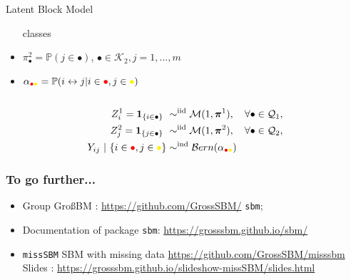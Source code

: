 \documentclass{beamer}\usepackage[]{graphicx}\usepackage[]{color}
\begin{document}
\begin{frame}
\begin{center}
\begin{overlayarea}{\textwidth}{.5\textheight}
\begin{columns}
\begin{column}{.5\paperwidth}
\begin{small}
\begin{block}{Latent Block Model}
\begin{itemize}
                classes
               \item  $\pi^2_\bullet  =  \mathbb{P}(j  \in  \bullet)$,
                $\bullet\in\mathcal{K}_2,j=1,\dots,m$
              \item      $\alpha_{\textcolor{red}{\bullet}\textcolor{yellow}{\bullet}}     =      \mathbb{P}(i
                \leftrightarrow j | i\in\textcolor{red}{\bullet},j\in\textcolor{yellow}{\bullet})$
              \end{itemize}
            \end{block}
          \end{small}
        \end{column}
      \end{columns}
    \end{overlayarea}
  \end{center}


\begin{align*}
Z^1_i = \mathbf{1}_{\{i \in \bullet\}}  \ & \sim^{\text{iid}} \mathcal{M}(1,\boldsymbol\pi^1), \quad \forall\bullet \in \mathcal{Q}_1, \\ 
Z^2_j=\mathbf{1}_{\{j \in \bullet\}}  \ & \sim^{\text{iid}} \mathcal{M}(1,\boldsymbol\pi^2), \quad \forall\bullet \in \mathcal{Q}_2, \\
Y_{ij} \ | \ \{i\in\textcolor{red}{\bullet},j\in\textcolor{yellow}{\bullet}\}
& \sim^{\text{ind}} \mathcal{B}ern(\alpha_{\textcolor{red}{\bullet}\textcolor{yellow}{\bullet}})\\
\end{align*}

\end{frame}

\begin{frame}
  \frametitle{To go further...}
  
  \begin{itemize}
    \item Group Gro{\ss}BM : \url{https://github.com/GrossSBM/}  \texttt{sbm}; 
    \item Documentation of package \texttt{sbm}: \url{https://grosssbm.github.io/sbm/}
    \item \texttt{missSBM} SBM with missing data \url{https://github.com/GrossSBM/misssbm} \\
    
      Slides : \url{https://grosssbm.github.io/slideshow-missSBM/slides.html}

  \end{itemize}
    
\end{frame}
\end{document}
